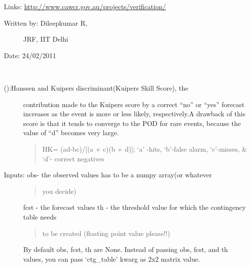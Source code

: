 \documentclass[letterpaper,10pt,english]{sphinxmanual}
\begin{document}
\begin{fulllineitems}
\begin{description}
\end{description}

Links: \href{http://www.cawcr.gov.au/projects/verification/}{http://www.cawcr.gov.au/projects/verification/}
\begin{description}
\item[{Written by: Dileepkumar R,}] \leavevmode
JRF, IIT Delhi

\end{description}

Date: 24/02/2011

\end{fulllineitems}


\begin{fulllineitems}
\label{diagnosis:ctgfunction.kss}~\begin{description}
\item[{{\hyperref[diagnosis:ctgfunction.kss]{}} ():Hanssen and Kuipers discriminant(Kuipers Skill Score), the}] \leavevmode
contribution made to the Kuipers score by a correct ``no'' or
``yes'' forecast increases as the event is more or less likely,
respectively.A drawback of this score is that it tends to converge
to the POD for rare events, because the value of ``d'' becomes very
large.
\begin{quote}

HK= (ad-bc)/{[}(a + c)(b + d){]}; `a' -hits, `b'-false alarm,
`c'-misses, \& `d'- correct negatives
\end{quote}

\item[{Inputs: obs- the observed values has to be a numpy array(or whatever}] \leavevmode\begin{quote}

you decide)
\end{quote}

fcst - the forecast values
th  - the threshold value for which the contingency table needs
\begin{quote}

to be created (floating point value please!!)
\end{quote}

By default obs, fcst, th are None. Instead of passing obs, fcst,
and th values, you can pass `ctg\_table' kwarg as 2x2 matrix value.


\end{description}
\end{fulllineitems}
\end{document}
